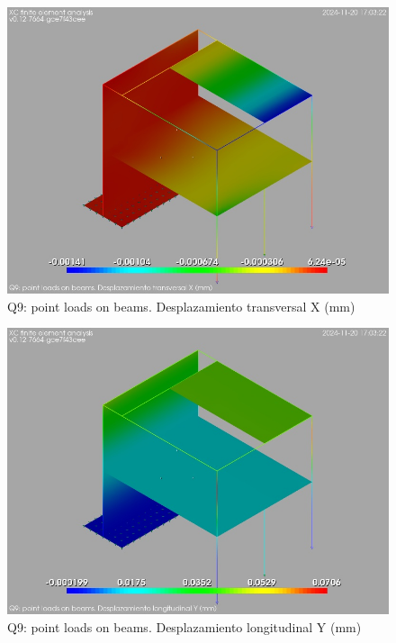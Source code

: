 \begin{figure}[ht]
\begin{center}
\includegraphics[width=\linewidth]{results/graphics/resSimplLC/QpntBeamsuX.png}
\caption{Q9: point loads on beams. Desplazamiento transversal X (mm)}
\label{QpntBeamsuX}
\end{center}
\end{figure}
\begin{figure}[ht]
\begin{center}
\includegraphics[width=\linewidth]{results/graphics/resSimplLC/QpntBeamsuY.png}
\caption{Q9: point loads on beams. Desplazamiento longitudinal Y (mm)}
\label{QpntBeamsuY}
\end{center}
\end{figure}
